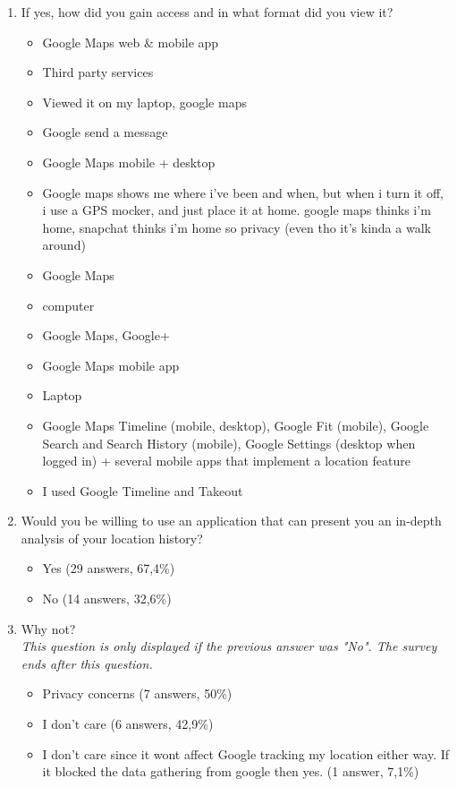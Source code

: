 \documentclass[12p]{article}
\begin{document}
\begin{enumerate}
		    \item If yes, how did you gain access and in what format did you view it?
		    \begin{itemize}
		        \item Google Maps web \& mobile app
		        \item Third party services
		        \item Viewed it on my laptop, google maps
		        \item Google send a message
		        \item Google Maps mobile + desktop 
		        \item Google maps shows me where i've been and when, but when i turn it off, i use a GPS mocker, and just place it at home. google maps thinks i'm home, snapchat thinks i'm home so privacy (even tho it's kinda a walk around)
		        \item Google Maps
		        \item computer
		        \item Google Maps, Google+
		        \item Google Maps mobile app
		        \item Laptop
		        \item Google Maps Timeline (mobile, desktop), Google Fit (mobile), Google Search and Search History (mobile), Google Settings (desktop when logged in) + several mobile apps that implement a location feature
		        \item I used Google Timeline and Takeout
		    \end{itemize}
		    
		    \item Would you be willing to use an application that can present you an in-depth analysis of your location history?
		    \begin{itemize}
		        \item Yes (29 answers, 67,4\%)
		        \item No (14 answers, 32,6\%)
		    \end{itemize}
		    
		    \item Why not?
		    \\\textit{This question is only displayed if the previous answer was "No". The survey ends after this question.}
		    \begin{itemize}
		        \item Privacy concerns (7 answers, 50\%)
		        \item I don't care (6 answers, 42,9\%)
		        \item I don't care since it wont affect Google tracking my location either way. If it blocked the data gathering from google then yes. (1 answer, 7,1\%)
		    \end{itemize}
		    

\end{enumerate}
\end{document}

